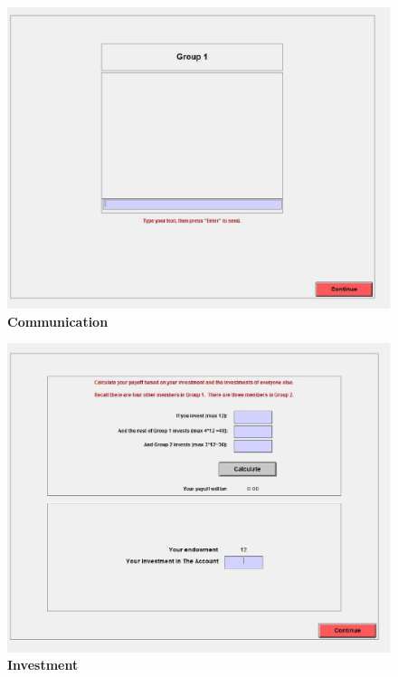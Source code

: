 \documentclass[12pt]{article}
\begin{document}
\newpage

\centering
\begin{figure}[H]
\includegraphics[width=40pc]{communication}
\caption*{\bf Communication}
\end{figure}

\newpage

\centering
\begin{figure}[H]
\includegraphics[width=40pc]{investment}
\caption*{\bf Investment}
\end{figure}

\newpage
\end{document}
